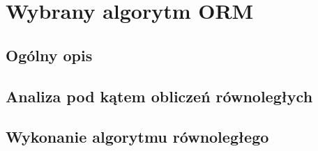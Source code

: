 \chapter{Wybrany algorytm ORM}
	\section{Ogólny opis}
	\section{Analiza pod kątem obliczeń równoległych}
	\section{Wykonanie algorytmu równoległego}